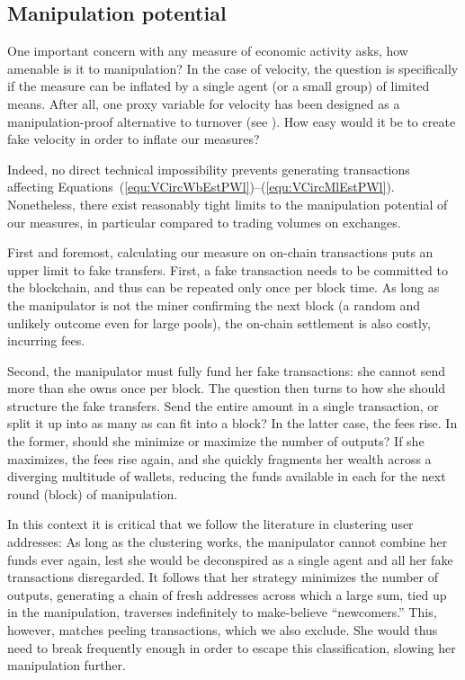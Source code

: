 \subsection{Manipulation potential}
\label{sec:cc_money_seg:manipul}%

One important concern with any measure of economic activity asks, how
amenable is it to manipulation?  In the case of velocity, the question is
specifically if the measure can be inflated by a single agent (or a small
group) of limited means.  After all, one proxy variable for velocity has been
designed as a manipulation-proof alternative to turnover (see
).  How easy would it be to
create fake velocity in order to inflate our measures?

Indeed, no direct technical impossibility prevents generating transactions
affecting Equations~(\ref{equ:VCircWbEstPWl})--(\ref{equ:VCircMlEstPWl}).
Nonetheless, there exist reasonably tight limits to the manipulation
potential of our measures, in particular compared to trading volumes on
exchanges.

First and foremost, calculating our measure on on-chain transactions puts an upper
limit to fake transfers.  First, a fake transaction needs to be committed to
the blockchain, and thus can be repeated only once per block time.  As long
as the manipulator is not the miner confirming the next block (a random and
unlikely outcome even for large pools), the on-chain settlement is also
costly, incurring fees.

Second, the manipulator must fully fund her fake transactions: she cannot
send more than she owns once per block.  The question then turns to how she
should structure the fake transfers.  Send the entire amount in a single
transaction, or split it up into as many as can fit into a block?  In the
latter case, the fees rise.  In the former, should she minimize or maximize
the number of outputs?  If she maximizes, the fees rise again, and she
quickly fragments her wealth across a diverging multitude of wallets,
reducing the funds available in each for the next round (block) of
manipulation.

In this context it is critical that we follow the literature in clustering
user addresses: As long as the clustering works, the manipulator cannot
combine her funds ever again, lest she would be deconspired as a single agent
and all her fake transactions disregarded.  It follows that her strategy
minimizes the number of outputs, generating a chain of fresh addresses across
which a large sum, tied up in the manipulation, traverses indefinitely to
make-believe ``newcomers.''  This, however, matches peeling transactions,
which we also exclude.  She would thus need to break frequently enough in
order to escape this classification, slowing her manipulation further.

